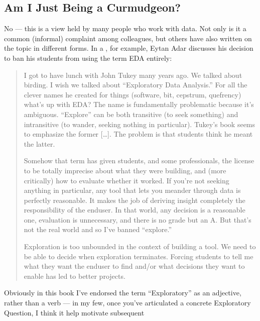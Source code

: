 \documentclass[letterpaper,10pt,english]{jupyterBook}
\begin{document}
\subsection{Am I Just Being a Curmudgeon?}
\label{\detokenize{30_questions/07_eda:am-i-just-being-a-curmudgeon}}
\sphinxAtStartPar
No — this is a view held by many people who work with data. Not only is it a common (informal) complaint among colleagues, but others have also written on the topic in different forms. In a , for example, Eytan Adar discusses his decision to ban his students from using the term EDA entirely:
\begin{quote}

\sphinxAtStartPar
I got to have lunch with John Tukey many years ago. We talked about birding. I wish we talked about “Exploratory Data Analysis.” For all the clever names he created for things (software, bit, cepstrum, quefrency) what’s up with EDA? The name is fundamentally problematic because it’s ambiguous. “Explore” can be both transitive (to seek something) and intransitive (to wander, seeking nothing in particular). Tukey’s book seems to emphasize the former {[}…{]}. The problem is that students think he meant the latter.

\sphinxAtStartPar
Somehow that term has given students, and some professionals, the license to be totally imprecise about what they were building, and (more critically) how to evaluate whether it worked. If you’re not seeking anything in particular, any tool that lets you meander through data is perfectly reasonable. It makes the job of deriving insight completely the responsibility of the end\sphinxhyphen{}user. In that world, any decision is a reasonable one, evaluation is unnecessary, and there is no grade but an A. But that’s not the real world and so I’ve banned “explore.”

\sphinxAtStartPar
Exploration is too unbounded in the context of building a tool. We need to be able to decide when exploration terminates. Forcing students to tell me what they want the end\sphinxhyphen{}user to find and/or what decisions they want to enable has led to better projects.
\end{quote}

\sphinxAtStartPar
Obviously in this book I’ve endorsed the term “Exploratory” as an adjective, rather than a verb — in my few, once you’ve articulated a concrete Exploratory Question, I think it  help motivate subsequent
\end{document}
